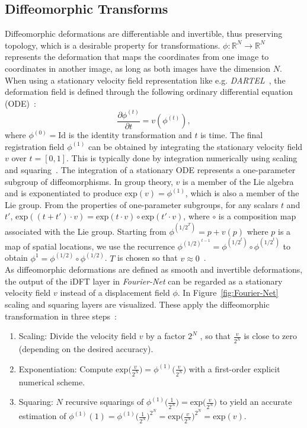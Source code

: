 \documentclass[english,version-2022-01]{uzl-thesis} %
\begin{document}
\subsection{Diffeomorphic Transforms} \label{SubSec:DiffeomorphicTransforms}
Diffeomorphic deformations are differentiable and invertible, thus preserving topology, which is a desirable property for transformations. $\phi: \mathbb{R}^N \rightarrow \mathbb{R}^N$ represents the deformation that maps the coordinates from one image to coordinates in another image, as long as both images have the dimension $N$. When using a stationary velocity field representation like e.g. \emph{DARTEL}~\cite{DARTEL}, the deformation field is defined through the following ordinary differential equation (ODE)~\cite{Dalca2018}:
\begin{equation}
	\frac{\partial \phi^{(t)}}{\partial t} = v(\phi^{(t)}),
\end{equation}
where $\phi^{(0)} = \text{Id}$ is the identity transformation and $t$ is time. The final registration field $\phi^{(1)}$ can be obtained by integrating the stationary velocity field $v$ over $t = [0, 1]$. This is typically done by integration numerically using scaling and squaring~\cite{ScaleAndSquare}. The integration of a stationary ODE represents a one-parameter subgroup of diffeomorphisms. In group theory, $v$ is a member of the Lie algebra and is exponentiated to produce $\text{exp}(v) = \phi^{(1)}$, which is also a member of the Lie group. From the properties of one-parameter subgroups, for any scalars $t$ and $t'$, $\text{exp}((t + t') \cdot v) = \text{exp}(t \cdot v) \circ \text{exp}(t' \cdot v)$, where $\circ$ is a composition map associated with the Lie group. Starting from $\phi^{({1/2}^T)} = p + v(p)$ where $p$ is a map of spatial locations, we use the recurrence $\phi^{({1/2})^{t−1}} = \phi^{({1/2}^t)} \circ \phi^{({1/2}^t)}$ to obtain $\phi^1 = \phi^{(1/2)} \circ \phi^{(1/2)}$. $T$ is chosen so that $v \approx 0$~\cite{Dalca2018}. \\
As diffeomorphic deformations are defined as smooth and invertible deformations, the output of the iDFT layer in \emph{Fourier-Net} can be regarded as a stationary velocity field $v$ instead of a displacement field $\phi$. In Figure~\ref{fig:Fourier-Net} scaling and squaring layers are visualized. These apply the diffeomorphic transformation in three steps~\cite{ScaleAndSquare}:
\begin{enumerate}
	\item Scaling: Divide the velocity field $v$ by a factor $2^N$ , so that $\frac{v}{2^N}$ is close to zero (depending on the desired accuracy).
	\item Exponentiation: Compute $\text{exp}\big(\frac{v}{2^N}\big) = \phi^{(1)}\big(\frac{v}{2^N}\big)$ with a first-order explicit numerical scheme.
	\item Squaring: $N$ recursive squarings of $\phi^{(1)}\big(\frac{1}{2^N}\big) = \text{exp}\big(\frac{v}{2^N}\big)$ to yield an accurate estimation of $\phi^{(1)}(1) = \phi^{(1)}\big(\frac{1}{2^N}\big)^{2^N} = \text{exp}\big(\frac{v}{2^N}\big)^{2^N} = \text{exp}(v)$.
\end{enumerate}
\end{document}
